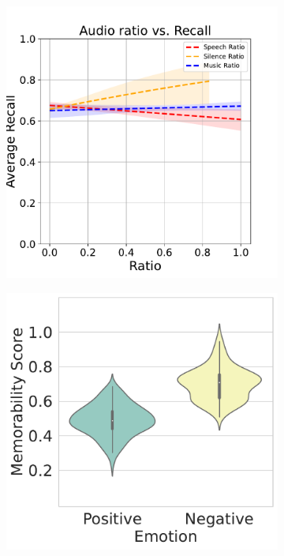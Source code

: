 \begin{landscape}
    \begin{figure}[]
    \centering
    \begin{subfigure}{0.3\textwidth}
        \centering
        \includegraphics[width=\textwidth]{images/audio1.pdf}
        \caption{}
        \label{subfig:speech vs recall}
    \end{subfigure}
    \begin{subfigure}{0.3\textwidth}
        \centering
        \includegraphics[width=\textwidth]{images/emotion_vs_recall_violin.pdf}

\end{subfigure}
\end{figure}
\end{landscape}

